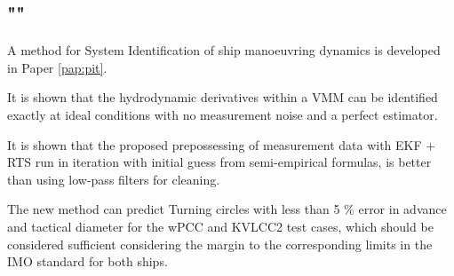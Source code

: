 \subsection*{""}
A method for System Identification of ship manoeuvring dynamics is developed in Paper \ref{pap:pit}. 

It is shown that the hydrodynamic derivatives within a VMM can be identified exactly at ideal conditions with no measurement noise and a perfect estimator.

It is shown that the proposed prepossessing of measurement data with EKF + RTS run in iteration with initial guess from semi-empirical formulas, is better than using low-pass filters for cleaning.

The new method can predict Turning circles with less than 5 \% error in advance and tactical diameter for the wPCC and KVLCC2 test cases, which should be considered sufficient considering the margin to the corresponding limits in the IMO standard for both ships.
